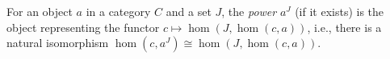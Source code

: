 For an object $a$ in a category $C$ and a set $J$, the \emph{power} $a^J$ (if it exists) is the object representing the functor $c \mapsto \hom(J, \hom(c, a))$, i.e., there is a natural isomorphism $\hom(c, a^J) \cong \hom(J, \hom(c, a))$.
